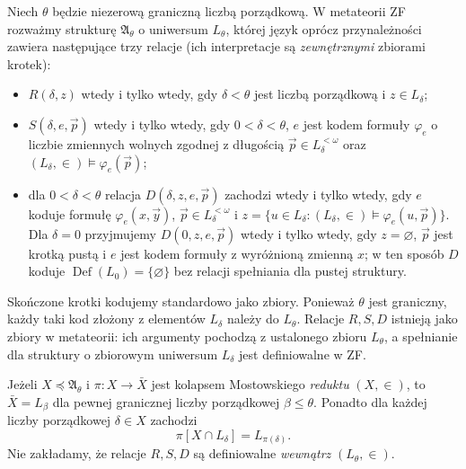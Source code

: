 \begin{lemat}
\label{lem:l-expanded-hull-condensation}
Niech $\theta$ będzie niezerową graniczną liczbą porządkową.
W metateorii ZF rozważmy strukturę $\mathfrak A_\theta$
o uniwersum $L_\theta$, której język oprócz przynależności
zawiera następujące trzy relacje (ich interpretacje są
\emph{zewnętrznymi} zbiorami krotek):
\begin{itemize}
\item $R(\delta,z)$ wtedy i tylko wtedy, gdy $\delta<\theta$
  jest liczbą porządkową i $z\in L_\delta$;
\item $S(\delta,e,\vec p)$ wtedy i tylko wtedy, gdy
  $0<\delta<\theta$, $e$ jest kodem formuły
  $\varphi_e$ o liczbie zmiennych wolnych zgodnej z
  długością $\vec p\in L_\delta^{<\omega}$ oraz
  $(L_\delta,\in)\models\varphi_e(\vec p)$;
\item dla $0<\delta<\theta$ relacja
  $D(\delta,z,e,\vec p)$ zachodzi wtedy i tylko wtedy,
  gdy $e$ koduje formułę $\varphi_e(x,\vec y)$,
  $\vec p\in L_\delta^{<\omega}$ i
  $z=\{u\in L_\delta:(L_\delta,\in)\models
  \varphi_e(u,\vec p)\}$. Dla $\delta=0$
  przyjmujemy $D(0,z,e,\vec p)$ wtedy i tylko wtedy,
  gdy $z=\varnothing$, $\vec p$ jest krotką pustą
  i $e$ jest kodem formuły z wyróżnioną zmienną $x$;
  w ten sposób $D$ koduje
  $\operatorname{Def}(L_0)=\{\varnothing\}$
  bez relacji spełniania dla pustej struktury.
\end{itemize}
Skończone krotki kodujemy standardowo jako zbiory.
Ponieważ $\theta$ jest graniczny, każdy taki kod
złożony z elementów $L_\delta$ należy do $L_\theta$.
Relacje $R,S,D$ istnieją jako zbiory w metateorii:
ich argumenty pochodzą z ustalonego zbioru $L_\theta$,
a spełnianie dla struktury o zbiorowym uniwersum
$L_\delta$ jest definiowalne w ZF.

Jeżeli $X\preccurlyeq\mathfrak A_\theta$ i
$\pi:X\to\bar X$ jest kolapsem Mostowskiego
\emph{reduktu} $(X,\in)$, to
$\bar X=L_\beta$ dla pewnej granicznej liczby
porządkowej $\beta\le\theta$. Ponadto dla każdej
liczby porządkowej $\delta\in X$ zachodzi
\[
\pi[X\cap L_\delta]=L_{\pi(\delta)}.
\]
Nie zakładamy, że relacje $R,S,D$ są definiowalne
\emph{wewnątrz} $(L_\theta,\in)$.
\end{lemat}
